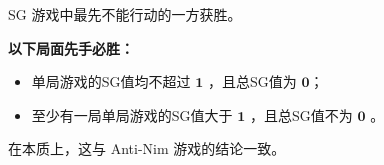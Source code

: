SG 游戏中最先不能行动的一方获胜。

\textbf{以下局面先手必胜：}

\begin{itemize}
    \item 单局游戏的SG值均不超过 $\pmb 1$ ，且总SG值为 $\pmb 0$；
    \item 至少有一局单局游戏的SG值大于 $\pmb 1$ ，且总SG值不为 $\pmb 0$ 。
\end{itemize}

在本质上，这与 Anti-Nim 游戏的结论一致。
